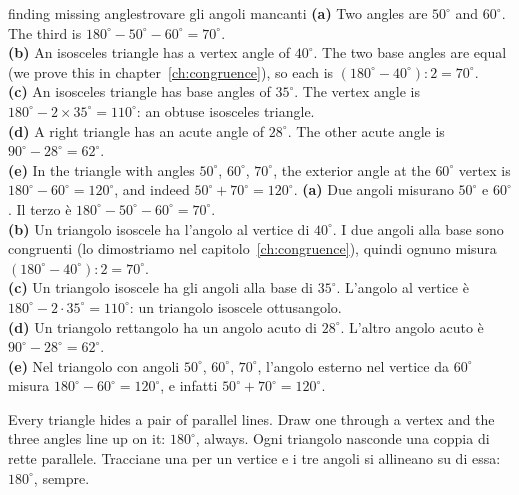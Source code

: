 \begin{example}{finding missing angles}{trovare gli angoli mancanti}
\textbf{(a)} Two angles are $50^\circ$ and $60^\circ$. The third is $180^\circ - 50^\circ - 60^\circ = 70^\circ$.\\
\textbf{(b)} An isosceles triangle has a vertex angle of $40^\circ$. The two base angles are equal (we prove this in chapter~\ref{ch:congruence}), so each is $(180^\circ - 40^\circ) : 2 = 70^\circ$.\\
\textbf{(c)} An isosceles triangle has base angles of $35^\circ$. The vertex angle is $180^\circ - 2 \times 35^\circ = 110^\circ$: an obtuse isosceles triangle.\\
\textbf{(d)} A right triangle has an acute angle of $28^\circ$. The other acute angle is $90^\circ - 28^\circ = 62^\circ$.\\
\textbf{(e)} In the triangle with angles $50^\circ$, $60^\circ$, $70^\circ$, the exterior angle at the $60^\circ$ vertex is $180^\circ - 60^\circ = 120^\circ$, and indeed $50^\circ + 70^\circ = 120^\circ$.
\tcblower
\textbf{(a)} Due angoli misurano $50^\circ$ e $60^\circ$. Il terzo è $180^\circ - 50^\circ - 60^\circ = 70^\circ$.\\
\textbf{(b)} Un triangolo isoscele ha l'angolo al vertice di $40^\circ$. I due angoli alla base sono congruenti (lo dimostriamo nel capitolo~\ref{ch:congruence}), quindi ognuno misura $(180^\circ - 40^\circ) : 2 = 70^\circ$.\\
\textbf{(c)} Un triangolo isoscele ha gli angoli alla base di $35^\circ$. L'angolo al vertice è $180^\circ - 2 \cdot 35^\circ = 110^\circ$: un triangolo isoscele ottusangolo.\\
\textbf{(d)} Un triangolo rettangolo ha un angolo acuto di $28^\circ$. L'altro angolo acuto è $90^\circ - 28^\circ = 62^\circ$.\\
\textbf{(e)} Nel triangolo con angoli $50^\circ$, $60^\circ$, $70^\circ$, l'angolo esterno nel vertice da $60^\circ$ misura $180^\circ - 60^\circ = 120^\circ$, e infatti $50^\circ + 70^\circ = 120^\circ$.
\end{example}

\begin{keyidea}{}{}
Every triangle hides a pair of parallel lines. Draw one through a vertex and the three angles line up on it: $180^\circ$, always.
\tcblower
Ogni triangolo nasconde una coppia di rette parallele. Tracciane una per un vertice e i tre angoli si allineano su di essa: $180^\circ$, sempre.
\end{keyidea}

